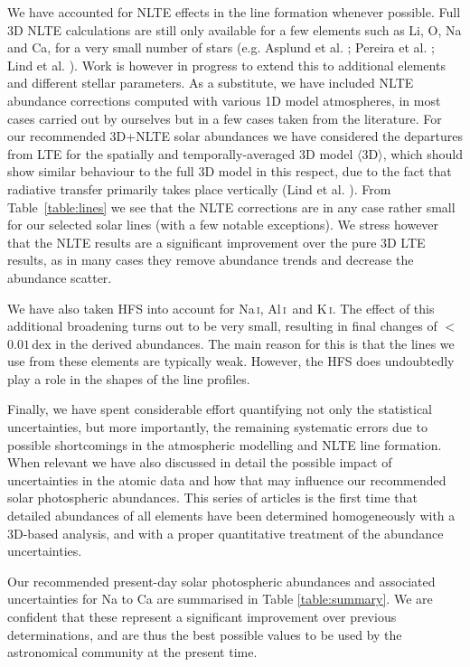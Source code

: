 \documentclass[traditabstract]{aa}
\newcommand{\oneDAV}{$\langle\mathrm{3D}\rangle$}
\newcommand{\altnai}{Na\,\textsc{i}}
\newcommand{\altali}{Al\,\textsc{i}}
\newcommand{\altki}{K\,\textsc{i}}
\newcommand{\ali}{\altali\ }
\begin{document}
We have accounted for NLTE effects in the line formation whenever possible. Full 3D NLTE calculations are still only available for a few elements such as Li, O, Na and Ca, for a very small number of stars (e.g. Asplund et al. \cite{asp4}; Pereira et al. \cite{pereira_o}; Lind et al. \cite{lind_li6}).  Work is however in progress to extend this to additional elements and different stellar parameters. As a substitute, we have included NLTE abundance corrections computed with various 1D model atmospheres, in most cases carried out by ourselves but in a few cases taken from the literature. For our recommended 3D+NLTE solar abundances we have considered the departures from LTE for the spatially and temporally-averaged 3D model \oneDAV, which should show similar behaviour to the full 3D model in this respect, due to the fact that radiative transfer primarily takes place vertically (Lind et al. \cite{lind_li6}).  From Table~\ref{table:lines} we see that the NLTE corrections are in any case rather small for our selected solar lines (with a few notable exceptions). We stress however that the NLTE results are a significant improvement over the pure 3D LTE results, as in many cases they remove abundance trends and decrease the abundance scatter.  

We have also taken HFS into account for \altnai, \ali and \altki. The effect of this additional broadening turns out to be very small, resulting in final changes of $<$$0.01$\,dex in the derived abundances. The main reason for this is that the lines we use from these elements are typically weak. However, the HFS does undoubtedly play a role in the shapes of the line profiles.

Finally, we have spent considerable effort quantifying not only the statistical uncertainties, but more importantly, the remaining systematic errors due to possible shortcomings in the atmospheric modelling and NLTE line formation. When relevant we have also discussed in detail the possible impact of uncertainties in the atomic data and how that may influence our recommended solar photospheric abundances. This series of articles is the first time that detailed abundances of all elements have been determined homogeneously with a 3D-based analysis, and with a proper quantitative treatment of the abundance uncertainties.

Our recommended present-day solar photospheric abundances and associated uncertainties for Na to Ca are summarised in Table \ref{table:summary}.  We are confident that these represent a significant improvement over previous determinations, and are thus the best possible values to be used by the astronomical community at the present time.
\end{document}
